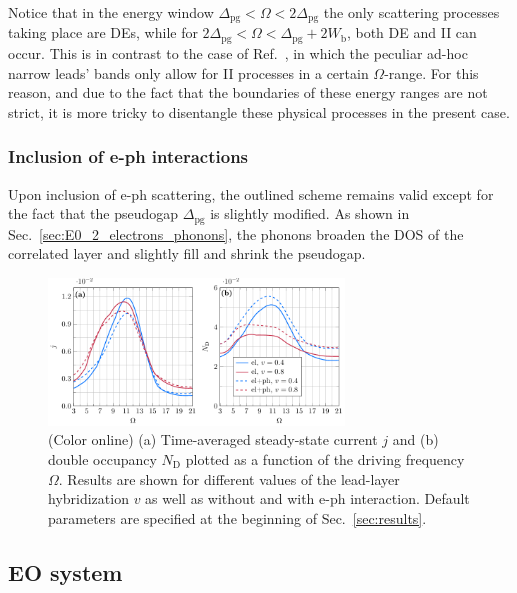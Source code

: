 \documentclass[aps,prb,groupedaddress,showpacs,twocolumn,superscriptaddress,10pt]{revtex4-2}
\begin{document}
Notice that in the energy window $\Delta_{\text{pg}}<\Omega<2\Delta_{\text{pg}}$ the only scattering processes taking place are DEs, while for $2\Delta_{\text{pg}}<\Omega<\Delta_{\text{pg}}+2W_{\text{b}}$, both DE and II can occur. 
This is in contrast to the case of Ref.~\cite{so.do.18}, in which the peculiar ad-hoc narrow leads' bands only allow for II processes in a certain $\Omega$-range.
For this reason, and due to the fact that the boundaries of these energy ranges are not strict, it is more tricky to disentangle these physical processes in the present case.

\subsubsection{Inclusion of e-ph interactions}
\label{sec:scheme_electrons_phonons}  

Upon inclusion of e-ph scattering, the outlined scheme remains valid except for the fact that  the pseudogap $\Delta_{\text{pg}}$ is slightly modified. As shown in Sec.~\ref{sec:E0_2_electrons_phonons}, the phonons broaden the DOS of the correlated layer and slightly fill and shrink the pseudogap.
 
\begin{figure}[t]
\includegraphics[width=0.7\textwidth]{./figures_Paper1/j_vs_omega_mu1_v_0.4_0.8_eph.pdf}
\caption{(Color online) 
 (a) Time-averaged steady-state current $j$ and (b) double occupancy $N_{\text{D}}$ plotted as a function of the driving frequency $\Omega$. Results are shown for different values of the lead-layer hybridization $v$ as well as without and with e-ph interaction.
 Default parameters are specified at the beginning of Sec.~\ref{sec:results}.} 
\label{fig:j_vs_omega_mu1_v_0.4_0.8_eph}
\end{figure}


\subsection{EO system}
\label{sec:E0_2_only_electrons} 
\end{document}
